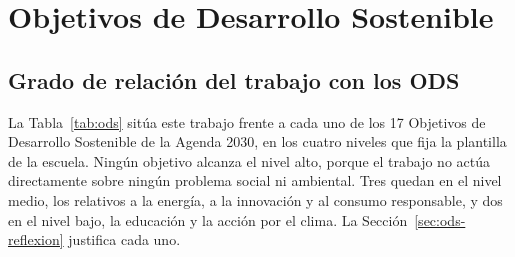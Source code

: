 \chapter{Objetivos de Desarrollo Sostenible}
\label{ap:ods}

\section{Grado de relación del trabajo con los ODS}
\label{sec:ods-tabla}

La Tabla~\ref{tab:ods} sitúa este trabajo frente a cada uno de los 17 Objetivos de Desarrollo Sostenible de la Agenda 2030, en los cuatro niveles que fija la plantilla de la escuela. Ningún objetivo alcanza el nivel alto, porque el trabajo no actúa directamente sobre ningún problema social ni ambiental. Tres quedan en el nivel medio, los relativos a la energía, a la innovación y al consumo responsable, y dos en el nivel bajo, la educación y la acción por el clima. La Sección~\ref{sec:ods-reflexion} justifica cada uno.

